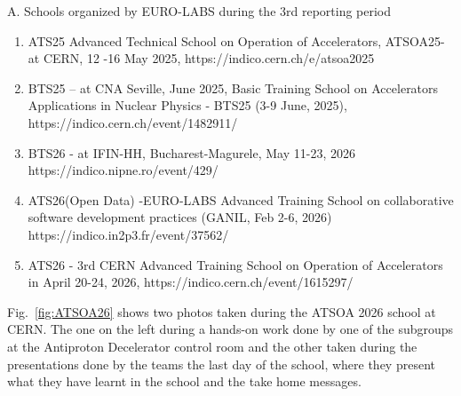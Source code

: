 A.	Schools organized by EURO-LABS during the 3rd reporting period
\begin{enumerate}
    \item ATS25 Advanced Technical School on Operation of Accelerators, ATSOA25- at CERN, 12 -16 May 2025, https://indico.cern.ch/e/atsoa2025 
\item	BTS25 – at CNA Seville, June 2025, Basic Training School on Accelerators Applications in Nuclear Physics - BTS25 (3-9 June, 2025), %
https://indico.cern.ch/event/1482911/
\item	BTS26 - at IFIN-HH, Bucharest-Magurele, May 11-23, 2026 https://indico.nipne.ro/event/429/ 
\item	ATS26(Open Data) -EURO-LABS Advanced Training School on collaborative software development practices (GANIL, Feb 2-6, 2026) https://indico.in2p3.fr/event/37562/ 
\item	ATS26 - 3rd CERN Advanced Training School on Operation of Accelerators in April 20-24, 2026,  https://indico.cern.ch/event/1615297/ 
\end{enumerate}

Fig.~\ref{fig:ATSOA26} shows two photos taken during the ATSOA 2026 school at CERN. The one on the left during a hands-on work done by one of the subgroups at the Antiproton Decelerator control room and the other taken during the presentations done by the teams the last day of the school, where they present what they have learnt in the school and the take home messages.


